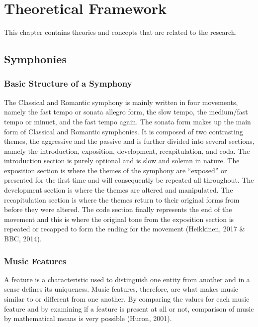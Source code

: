 %
%
%                 

\chapter{Theoretical Framework}
This chapter contains theories and concepts that are related to the research.

\section{Symphonies}
\subsection{Basic Structure of a Symphony}
The Classical and Romantic symphony is mainly written in four movements, namely the fast tempo or sonata allegro form, the slow tempo, the medium/fast tempo or minuet, and the fast tempo again. The sonata form makes up the main form of Classical and Romantic symphonies. It is composed of two contrasting themes, the aggressive and the passive and is further divided into several sections, namely the introduction, exposition, development, recapitulation, and coda. The introduction section is purely optional and is slow and solemn in nature. The exposition section is where the themes of the symphony are “exposed” or presented for the first time and will consequently be repeated all throughout. The development section is where the themes are altered and manipulated. The recapitulation section is where the themes return to their original forms from before they were altered. The code section finally represents the end of the movement and this is where the original tone from the exposition section is repeated or recapped to form the ending for the movement (Heikkinen, 2017 \& BBC, 2014).

\subsection{Music Features}

A feature is a characteristic used to distinguish one entity from another and in a sense defines its uniqueness. Music features, therefore, are what makes music similar to or different from one another. By comparing the values  for each music feature and by examining if a feature is present at all or not, comparison of music by mathematical means is very possible (Huron, 2001).

